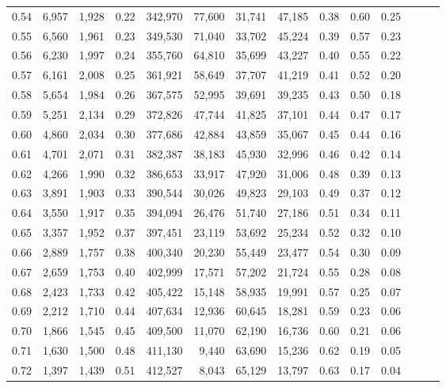 \begin{tabular}{rrrrrrrrrrrrrr}
0.54 &  6,957 &  1,928 &  0.22 &  342,970 &   77,600 &  31,741 &  47,185 &  0.38 &  0.60 &      0.25 \\
0.55 &  6,560 &  1,961 &  0.23 &  349,530 &   71,040 &  33,702 &  45,224 &  0.39 &  0.57 &      0.23 \\
0.56 &  6,230 &  1,997 &  0.24 &  355,760 &   64,810 &  35,699 &  43,227 &  0.40 &  0.55 &      0.22 \\
0.57 &  6,161 &  2,008 &  0.25 &  361,921 &   58,649 &  37,707 &  41,219 &  0.41 &  0.52 &      0.20 \\
0.58 &  5,654 &  1,984 &  0.26 &  367,575 &   52,995 &  39,691 &  39,235 &  0.43 &  0.50 &      0.18 \\
0.59 &  5,251 &  2,134 &  0.29 &  372,826 &   47,744 &  41,825 &  37,101 &  0.44 &  0.47 &      0.17 \\
0.60 &  4,860 &  2,034 &  0.30 &  377,686 &   42,884 &  43,859 &  35,067 &  0.45 &  0.44 &      0.16 \\
0.61 &  4,701 &  2,071 &  0.31 &  382,387 &   38,183 &  45,930 &  32,996 &  0.46 &  0.42 &      0.14 \\
0.62 &  4,266 &  1,990 &  0.32 &  386,653 &   33,917 &  47,920 &  31,006 &  0.48 &  0.39 &      0.13 \\
0.63 &  3,891 &  1,903 &  0.33 &  390,544 &   30,026 &  49,823 &  29,103 &  0.49 &  0.37 &      0.12 \\
0.64 &  3,550 &  1,917 &  0.35 &  394,094 &   26,476 &  51,740 &  27,186 &  0.51 &  0.34 &      0.11 \\
0.65 &  3,357 &  1,952 &  0.37 &  397,451 &   23,119 &  53,692 &  25,234 &  0.52 &  0.32 &      0.10 \\
0.66 &  2,889 &  1,757 &  0.38 &  400,340 &   20,230 &  55,449 &  23,477 &  0.54 &  0.30 &      0.09 \\
0.67 &  2,659 &  1,753 &  0.40 &  402,999 &   17,571 &  57,202 &  21,724 &  0.55 &  0.28 &      0.08 \\
0.68 &  2,423 &  1,733 &  0.42 &  405,422 &   15,148 &  58,935 &  19,991 &  0.57 &  0.25 &      0.07 \\
0.69 &  2,212 &  1,710 &  0.44 &  407,634 &   12,936 &  60,645 &  18,281 &  0.59 &  0.23 &      0.06 \\
0.70 &  1,866 &  1,545 &  0.45 &  409,500 &   11,070 &  62,190 &  16,736 &  0.60 &  0.21 &      0.06 \\
0.71 &  1,630 &  1,500 &  0.48 &  411,130 &    9,440 &  63,690 &  15,236 &  0.62 &  0.19 &      0.05 \\
0.72 &  1,397 &  1,439 &  0.51 &  412,527 &    8,043 &  65,129 &  13,797 &  0.63 &  0.17 &      0.04 \\

\end{tabular}
